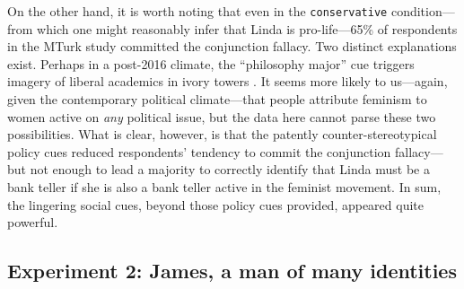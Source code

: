 \documentclass[12pt, letterpaper]{article}
\begin{document}
On the other hand, it is worth noting that even in the {\tt conservative} condition---from which one might reasonably infer that Linda is pro-life---65\% of respondents in the MTurk study committed the conjunction fallacy. Two distinct explanations exist. Perhaps in a post-2016 climate, the ``philosophy major'' cue triggers imagery of liberal academics in ivory towers \citep[e.g.,][]{pew_education}. It seems more likely to us---again, given the contemporary political climate---that people attribute feminism to women active on \emph{any} political issue, but the data here cannot parse these two possibilities. What is clear, however, is that the patently counter-stereotypical policy cues reduced respondents' tendency to commit the conjunction fallacy---but not enough to lead a majority to correctly identify that Linda must be a bank teller if she is also a bank teller active in the feminist movement. In sum, the lingering social cues, beyond those policy cues provided, appeared quite powerful.

\subsection{Experiment 2: James, a man of many identities}
\end{document}
